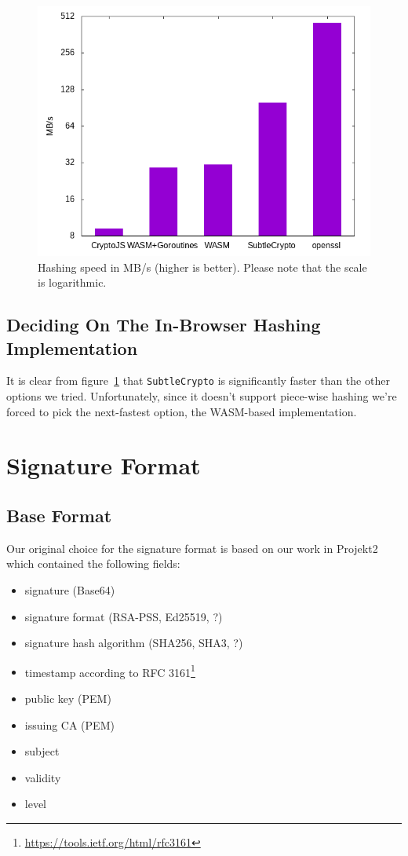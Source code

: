 \begin{figure}
    \begin{center}
        \includegraphics[width=0.7\linewidth]{images/hashingperformance.png}
        \caption{Hashing speed in MB/s (higher is better). Please note that the scale is logarithmic.}
        \label{fig:hashingperformance}
    \end{center}
\end{figure}


\subsection{Deciding On The In-Browser Hashing Implementation}
\label{subsec:deciding-on-the-in-browser-hashing-implementation}
It is clear from figure~\ref{fig:hashingperformance} that \texttt{SubtleCrypto} is significantly faster than the other options we tried.
Unfortunately, since it doesn't support piece-wise hashing we're forced to pick the next-fastest option, the \gls{WASM}-based implementation.

\section{Signature Format}
\label{sec:signatureformat}

\subsection{Base Format}
Our original choice for the signature format is based on our work in Projekt2 which contained the following fields:

\begin{itemize}
	\item signature (Base64)
	\item signature format (\gls{RSA-PSS}, \gls{Ed25519}, ?)
	\item signature hash algorithm (\gls{SHA}256, \gls{SHA}3, ?)
	\item timestamp according to \gls{RFC} 3161\footnote{\url{https://tools.ietf.org/html/rfc3161}}
	\item public key (\gls{PEM})
	\item issuing \gls{CA} (\gls{PEM})
	\item subject
	\item validity
	\item level
\end{itemize}

